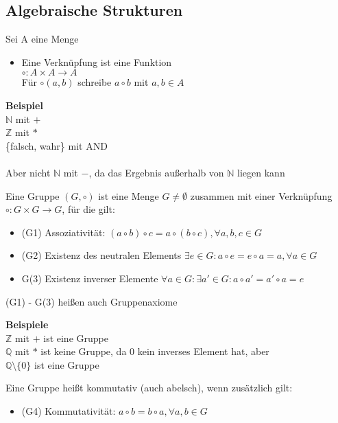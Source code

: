 \documentclass{article}
\begin{document}
	\subsection{Algebraische Strukturen}
	Sei A eine Menge
	\begin{itemize}
	\item Eine Verknüpfung ist eine Funktion\\
	\tabto{2cm} $\circ : A \times A \to A$\\
	Für $\circ (a,b)$ schreibe $a \circ b$ mit $a,b \in A$
	\end{itemize}
	\begin{tcolorbox}[width=\linewidth, sharp corners=all, colback=white!95!black]
	\textbf{Beispiel}\\
	$\mathbb{N}$ mit $+$\\
	$\mathbb{Z}$ mit $*$\\
	\{falsch, wahr\} mit AND\\\\
	Aber nicht $\mathbb{N}$ mit $-$, da das Ergebnis außerhalb von $\mathbb{N}$ liegen kann\\
	\end{tcolorbox}	
	Eine Gruppe $(G, \circ )$ ist eine Menge $G \neq \emptyset$ zusammen mit einer Verknüpfung $\circ : G \times G \to G$, für die gilt:
	\begin{itemize}
	\item (G1) Assoziativität: $(a \circ b ) \circ c = a \circ (b \circ c), \forall a,b,c \in G$
	\item (G2) Existenz des neutralen Elements $\exists e \in G: a \circ e = e \circ a = a, \forall a \in G$
	\item G(3) Existenz inverser Elemente $\forall a \in G: \exists a' \in G: a \circ a' = a' \circ a = e$
	\end{itemize}
	(G1) - G(3) heißen auch Gruppenaxiome
	\begin{tcolorbox}[width=\linewidth, sharp corners=all, colback=white!95!black]
	\textbf{Beispiele}\\
	$\mathbb{Z}$ mit $+$ ist eine Gruppe\\
	$\mathbb{Q}$ mit $*$ ist keine Gruppe, da 0 kein inverses Element hat, aber\\
	$\mathbb{Q} \setminus \{0\}$ ist eine Gruppe 
	\end{tcolorbox}
	Eine Gruppe heißt kommutativ (auch abelsch), wenn zusätzlich gilt:
	\begin{itemize}
	\item (G4) Kommutativität: $a \circ b = b \circ a, \forall a,b \in G$
	\end{itemize}
\end{document}
